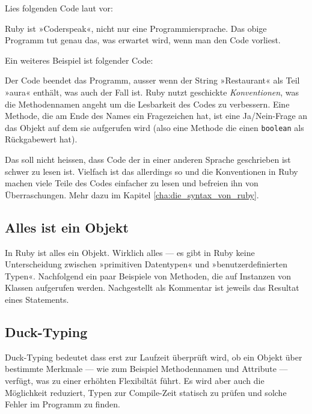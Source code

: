 \documentclass[a4book,11pt,twoside]{scrbook}
\begin{document}
Lies folgenden Code laut vor:


Ruby ist »Coderspeak«, nicht nur eine Programmiersprache. Das obige Programm tut genau das, was erwartet wird, wenn man den Code vorliest.

Ein weiteres Beispiel ist folgender Code:


Der Code beendet das Programm, ausser wenn der String »Restaurant« als Teil »aura« enthält, was auch der Fall ist. Ruby nutzt geschickte \emph{Konventionen}, was die Methodennamen angeht um die Lesbarkeit des Codes zu verbessern. Eine Methode, die am Ende des Names ein Fragezeichen hat, ist eine Ja/Nein-Frage an das Objekt auf dem sie aufgerufen wird (also eine Methode die einen \texttt{boolean} als Rückgabewert hat).

Das soll nicht heissen, dass Code der in einer anderen Sprache geschrieben ist schwer zu lesen ist. Vielfach ist das allerdings so und die Konventionen in Ruby machen viele Teile des Codes einfacher zu lesen und befreien ihn von Überraschungen. Mehr dazu im Kapitel \ref{cha:die_syntax_von_ruby}.



\subsection*{Alles ist ein Objekt} %
\label{sub:alles_ist_ein_objekt}
In Ruby ist alles ein Objekt. Wirklich alles --- es gibt in Ruby keine Unterscheidung zwischen »primitiven Datentypen« und »benutzerdefinierten Typen«.
Nachfolgend ein paar Beispiele von Methoden, die auf Instanzen von Klassen aufgerufen werden. Nachgestellt als Kommentar ist jeweils das Resultat eines Statements.




\subsection*{Duck-Typing} %
\label{sub:duck_typing}
\begin{quotation}
\end{quotation}

Duck-Typing bedeutet dass erst zur Laufzeit überprüft wird, ob ein Objekt über bestimmte Merkmale — wie zum Beispiel Methodennamen und Attribute — verfügt, was zu einer erhöhten Flexibiltät führt. Es wird aber auch die Möglichkeit reduziert, Typen zur Compile-Zeit statisch zu prüfen und solche Fehler im Programm zu finden.
\end{document}
